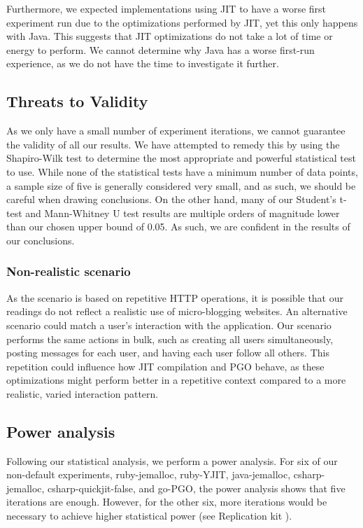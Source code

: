 \documentclass[main.tex]{subfiles}
\begin{document}
Furthermore, we expected implementations using JIT to have a worse first experiment run due to the optimizations performed by JIT, yet this only happens with Java. This suggests that JIT optimizations do not take a lot of time or energy to perform. We cannot determine why Java has a worse first-run experience, as we do not have the time to investigate it further.

\subsection{Threats to Validity}
\label{section:threats-to-validity}

As we only have a small number of experiment iterations, we cannot guarantee the validity of all our results. We have attempted to remedy this by using the Shapiro-Wilk test to determine the most appropriate and powerful statistical test to use. While none of the statistical tests have a minimum number of data points, a sample size of five is generally considered very small, and as such, we should be careful when drawing conclusions. On the other hand, many of our Student's t-test and Mann-Whitney U test results are multiple orders of magnitude lower than our chosen upper bound of 0.05. As such, we are confident in the results of our conclusions.

\subsubsection{Non-realistic scenario}

As the scenario is based on repetitive HTTP operations, it is possible that our readings do not reflect a realistic use of micro-blogging websites. An alternative scenario could match a user's interaction with the application. Our scenario performs the same actions in bulk, such as creating all users simultaneously, posting messages for each user, and having each user follow all others. This repetition could influence how JIT compilation and PGO behave, as these optimizations might perform better in a repetitive context compared to a more realistic, varied interaction pattern.

\subsection{Power analysis}
Following our statistical analysis, we perform a power analysis. For six of our non-default experiments, ruby-jemalloc, ruby-YJIT, java-jemalloc, csharp-jemalloc, csharp-quickjit-false, and go-PGO, the power analysis shows that five iterations are enough. However, for the other six, more iterations would be necessary to achieve higher statistical power (see Replication kit \cite{replication-kit-Karlsen_Landsgaard_Offenberg_Pedersen_2025}).
\end{document}
